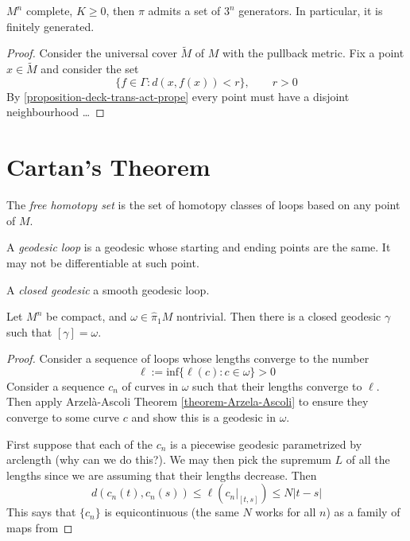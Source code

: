 \documentclass{book}
\begin{document}
\begin{theorem}[Gromov]
\label{theorem-Gromov}
$M^n$ complete, $K \geq 0$, then $\pi$ admits
a set of $3^n$ generators. In
particular, it is finitely generated.
\end{theorem}

\begin{proof}
Consider the universal cover $\tilde{M}$ of
$M$ with the pullback metric. Fix a
point $x \in \tilde{M}$ and consider the set
$$
\{f \in \Gamma:d(x,f(x))<r\},\qquad r>0
$$
By \ref{proposition-deck-trans-act-prope}
every point must have a disjoint
neighbourhood …
\end{proof}

\section{Cartan's Theorem}
\label{section-Cartan-theorem}

\begin{definition}
\label{definition-free-homotopy-set}
The {\it free homotopy set} is the set of
homotopy classes of loops based on any
point of $M$.
\end{definition}

\begin{definition}
\label{definition-geodesic-loop}
A {\it geodesic loop} is a geodesic whose
starting and ending points are the
same. It may not be differentiable at such
point.
\end{definition}

\begin{definition}
\label{definition-closed-geodesic}
A {\it closed geodesic} a smooth geodesic
loop.
\end{definition}

\begin{theorem}[Cartan]
\label{theorem-Cartan}
Let $M^n$ be compact, and $\omega \in
\hat{\pi}_1M$ nontrivial. Then there is a
closed geodesic $\gamma$ such that
$[\gamma]=\omega$.
\end{theorem}

\begin{proof}
Consider a sequence of loops whose lengths
converge to the number
$$
\ell:=\text{inf}\{\ell(c):c \in \omega\}>0
$$
Consider a sequence $c_n$ of curves in
$\omega$ such that their lengths converge
to $\ell$. Then apply Arzelà-Ascoli Theorem
\ref{theorem-Arzela-Ascoli}
 to ensure they converge to some curve $c$
 and show this is a geodesic
in $\omega$.

First suppose that each of the $c_n$ is a
piecewise geodesic parametrized by
arclength (why can we do this?). We may then
pick the supremum $L$ of all the
lengths since we are assuming that their
lengths decrease. Then
$$
d(c_n(t),c_n(s)) \leq \ell
\left(c_n|_{[t,s]}\right) \leq  N |t-s|
$$
This says that $\{c_n\}$ is equicontinuous
(the same $N$ works for all $n$) as a
family of maps from
\end{proof}
\end{document}
